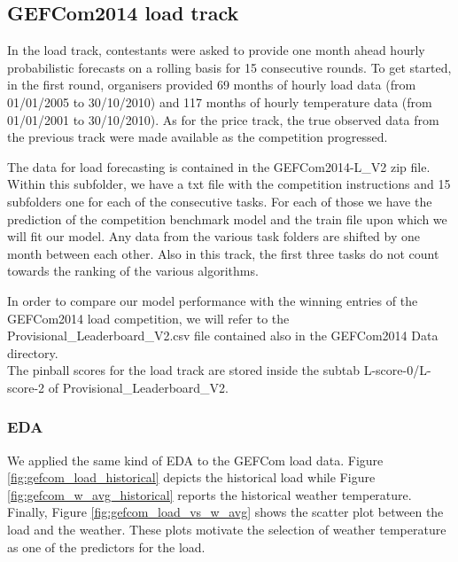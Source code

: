 \subsection{GEFCom2014 load track}
In the load track, contestants were asked to provide one month ahead hourly probabilistic forecasts on a rolling basis for 15 consecutive rounds. To get started, in the first round, organisers provided 69 months of hourly load data (from 01/01/2005 to 30/10/2010) and 117 months of hourly temperature data (from 01/01/2001 to 30/10/2010). 
As for the price track, the true observed data from the previous track were made available as the competition progressed.

The data for load forecasting is contained in the GEFCom2014-L\_V2 zip file. Within this subfolder, we have a txt file with the competition instructions and 15 subfolders one for each of the consecutive tasks. For each of those we have the prediction of the competition benchmark model and the train file upon which we will fit our model.
Any data from the various task folders are shifted by one month between each other.
Also in this track, the first three tasks do not count towards the ranking of the various algorithms.

In order to compare our model performance with the winning entries of the GEFCom2014 load competition, we will refer to the Provisional\_Leaderboard\_\-V2.csv file contained also in the GEFCom2014 Data directory.
\\
The pinball scores for the load track are stored inside the subtab L-score-0/L-score-2 of Provisional\_Leaderboard\_V2.
\subsubsection{EDA}
We applied the same kind of EDA to the GEFCom load data. Figure \ref{fig:gefcom_load_historical} depicts the historical load while Figure \ref{fig:gefcom_w_avg_historical} reports the historical weather temperature. Finally, Figure \ref{fig:gefcom_load_vs_w_avg} shows the scatter plot between the load and the weather.
These plots motivate the selection of weather temperature as one of the predictors for the load.

